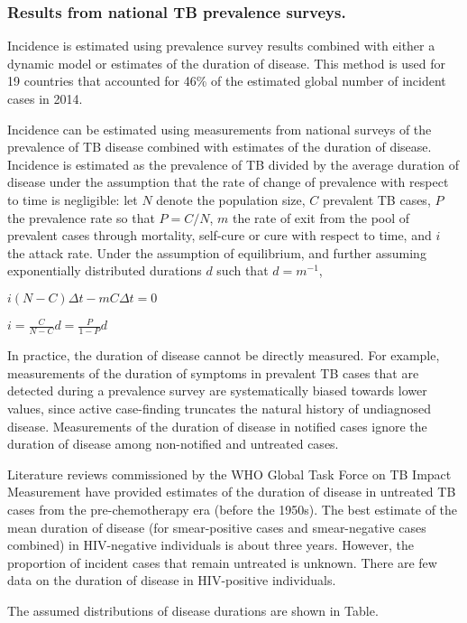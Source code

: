 \subsubsection {Results from national TB prevalence surveys.} Incidence is estimated using prevalence survey results combined with either a dynamic model or estimates of the duration of disease. This method is used for 19 countries that accounted for 46\% of the estimated global number of incident cases in 2014.

Incidence can be estimated using measurements from national surveys of the prevalence of TB disease combined with estimates of the duration of disease. Incidence is estimated as the prevalence of TB divided by the average duration of disease under the assumption that the rate of change of prevalence with respect to time is negligible: let $N$ denote the population size, $C$ prevalent TB cases, $P$ the prevalence rate so that $P = C/N$, $m$ the rate of exit from the pool of prevalent cases through mortality, self-cure or cure with respect to time, and $i$ the attack rate. Under the assumption of equilibrium, and further assuming exponentially distributed durations $d$ such that $d = m^{-1}$,

$i(N - C)\Delta t - m C\Delta t = 0$

$i = \frac{C}{N - C} d = \frac{P}{1 - P} d$

In practice, the duration of disease cannot be directly measured. For example, measurements of the duration of symptoms in prevalent TB cases that are detected during a prevalence survey are systematically biased towards lower values, since active case-finding truncates the natural history of undiagnosed disease. Measurements of the duration of disease in notified cases ignore the duration of disease among non-notified and untreated cases. 

Literature reviews commissioned by the WHO Global Task Force on TB Impact Measurement have provided estimates of the duration of disease in untreated TB cases from the pre-chemotherapy era (before the 1950s). The best estimate of the mean duration of disease (for smear-positive cases and smear-negative cases combined) in HIV-negative individuals is about three years. However, the proportion of incident cases that remain untreated is unknown. There are few data on the duration of disease in HIV-positive individuals. 

The assumed distributions of disease durations are shown in Table.

